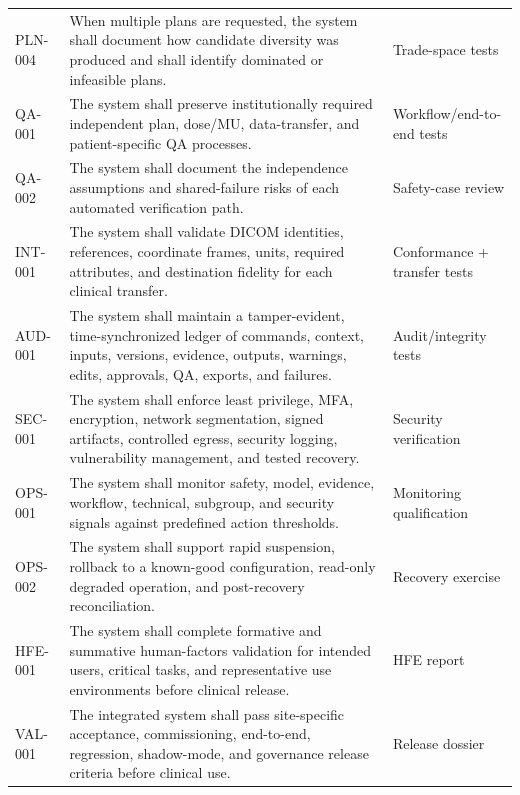 \documentclass[11pt,letterpaper]{article}
\begin{document}
\begin{small}
\begin{longtable}{@{}L{0.1032\textwidth}L{0.6723\textwidth}L{0.1445\textwidth}@{}}
\addlinespace[2pt]
PLN-004 & When multiple plans are requested, the system shall document how candidate diversity was produced and shall identify dominated or infeasible plans. & Trade-space tests \\
\addlinespace[2pt]
QA-001 & The system shall preserve institutionally required independent plan, dose\slash\allowbreak{}MU, data-transfer, and patient-specific QA processes. & Workflow\slash\allowbreak{}end-to-end tests \\
\addlinespace[2pt]
QA-002 & The system shall document the independence assumptions and shared-failure risks of each automated verification path. & Safety-case review \\
\addlinespace[2pt]
INT-001 & The system shall validate DICOM identities, references, coordinate frames, units, required attributes, and destination fidelity for each clinical transfer. & Conformance + transfer tests \\
\addlinespace[2pt]
AUD-001 & The system shall maintain a tamper-evident, time-synchronized ledger of commands, context, inputs, versions, evidence, outputs, warnings, edits, approvals, QA, exports, and failures. & Audit\slash\allowbreak{}integrity tests \\
\addlinespace[2pt]
SEC-001 & The system shall enforce least privilege, MFA, encryption, network segmentation, signed artifacts, controlled egress, security logging, vulnerability management, and tested recovery. & Security verification \\
\addlinespace[2pt]
OPS-001 & The system shall monitor safety, model, evidence, workflow, technical, subgroup, and security signals against predefined action thresholds. & Monitoring qualification \\
\addlinespace[2pt]
OPS-002 & The system shall support rapid suspension, rollback to a known-good configuration, read-only degraded operation, and post-recovery reconciliation. & Recovery exercise \\
\addlinespace[2pt]
HFE-001 & The system shall complete formative and summative human-factors validation for intended users, critical tasks, and representative use environments before clinical release. & HFE report \\
\addlinespace[2pt]
VAL-001 & The integrated system shall pass site-specific acceptance, commissioning, end-to-end, regression, shadow-mode, and governance release criteria before clinical use. & Release dossier \\
\end{longtable}
\end{small}
\end{document}
